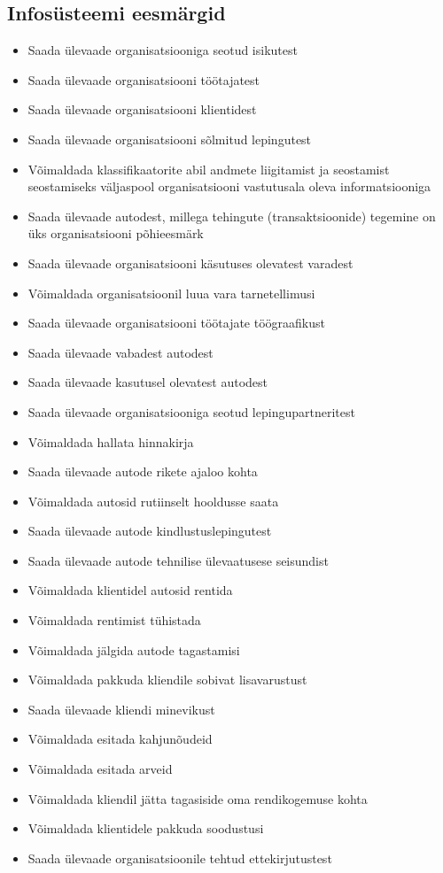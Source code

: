 \documentclass{report}
\begin{document}
\subsection{Infosüsteemi eesmärgid}
\begin{itemize}
	\item Saada ülevaade organisatsiooniga seotud isikutest
	\item Saada ülevaade organisatsiooni töötajatest
	\item Saada ülevaade organisatsiooni klientidest
	\item Saada ülevaade organisatsiooni sõlmitud lepingutest
	\item Võimaldada klassifikaatorite abil andmete liigitamist ja seostamist seostamiseks väljaspool organisatsiooni vastutusala oleva informatsiooniga
	\item Saada ülevaade autodest, millega tehingute (transaktsioonide) tegemine on üks organisatsiooni põhieesmärk
	\item Saada ülevaade organisatsiooni käsutuses olevatest varadest
	\item Võimaldada organisatsioonil luua vara tarnetellimusi
	\item Saada ülevaade organisatsiooni töötajate töögraafikust
	\item Saada ülevaade vabadest autodest
	\item Saada ülevaade kasutusel olevatest autodest
	\item Saada ülevaade organisatsiooniga seotud lepingupartneritest
	\item Võimaldada hallata hinnakirja
	\item Saada ülevaade autode rikete ajaloo kohta
	\item Võimaldada autosid rutiinselt hooldusse saata
	\item Saada ülevaade autode kindlustuslepingutest
	\item Saada ülevaade autode tehnilise ülevaatusese seisundist
	\item Võimaldada klientidel autosid rentida
	\item Võimaldada rentimist tühistada
	\item Võimaldada jälgida autode tagastamisi
	\item Võimaldada pakkuda kliendile sobivat lisavarustust
	\item Saada ülevaade kliendi minevikust
	\item Võimaldada esitada kahjunõudeid
	\item Võimaldada esitada arveid
	\item Võimaldada kliendil jätta tagasiside oma rendikogemuse kohta
	\item Võimaldada klientidele pakkuda soodustusi
	\item Saada ülevaade organisatsioonile tehtud ettekirjutustest
\end{itemize}
\end{document}
